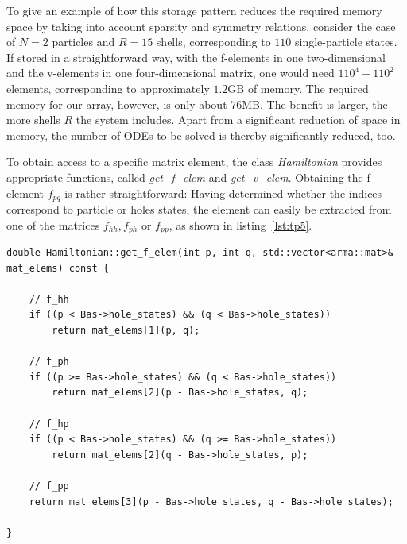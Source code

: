 To give an example of how this storage pattern reduces the required memory space by taking into account sparsity and symmetry relations, consider the case of $N=2$ particles and $R=15$ shells, corresponding to $110$ single-particle states. If stored in a straightforward way, with the \mbox{f-elements} in one two-dimensional and the v-elements in one four-dimensional matrix, one would need $110^4+110^2$ elements, corresponding to approximately $1.2$GB of memory. The required memory for our array, however, is only about $76$MB. The benefit is larger, the more shells $R$ the system includes. Apart from a  significant reduction of space in memory, the number of ODEs to be solved is thereby significantly reduced, too. 

To obtain access to a specific matrix element, the class \textit{Hamiltonian} provides appropriate functions, called \textit{get\_f\_elem} and \textit{get\_v\_elem}. Obtaining the f-element $f_{pq}$ is rather straightforward: Having determined whether the indices correspond to particle or holes states, the element can easily be extracted from one of the matrices $f_{hh},f_{ph}$ or $f_{pp}$, as shown in \mbox{listing \ref{lst:tp5}}.

\begin{lstlisting}[float, caption={Access to f-elements via the function \textit{get\_f\_elem}. The main idea is to determine which of the three possible matrices $f_{hh}$, $f_{ph}$ and $f_{pp}$ has to be used.}, label={lst:tp5}]
double Hamiltonian::get_f_elem(int p, int q, std::vector<arma::mat>& mat_elems) const {

    // f_hh
    if ((p < Bas->hole_states) && (q < Bas->hole_states))
        return mat_elems[1](p, q);

    // f_ph
    if ((p >= Bas->hole_states) && (q < Bas->hole_states))
        return mat_elems[2](p - Bas->hole_states, q);

    // f_hp
    if ((p < Bas->hole_states) && (q >= Bas->hole_states))
        return mat_elems[2](q - Bas->hole_states, p);

    // f_pp
    return mat_elems[3](p - Bas->hole_states, q - Bas->hole_states);

}
\end{lstlisting}

